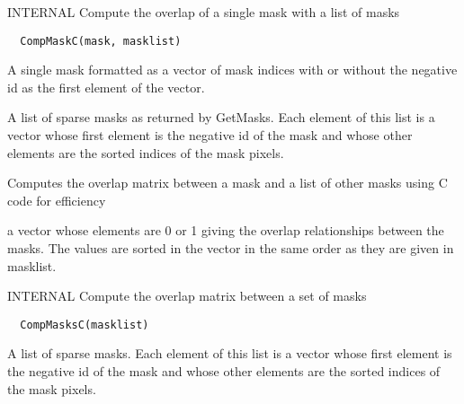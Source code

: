 \documentclass[a4paper]{book}
\begin{document}
%
\begin{Description}\relax
INTERNAL Compute the overlap of a single mask with a list
of masks
\end{Description}
%
\begin{Usage}
\begin{verbatim}
  CompMaskC(mask, masklist)
\end{verbatim}
\end{Usage}
%
\begin{Arguments}
\begin{ldescription}
\item[\code{mask}] A single mask formatted as a vector of mask
indices with or without the negative id as the first
element of the vector.

\item[\code{masklist}] A list of sparse masks as returned by
GetMasks.  Each element of this list is a vector whose
first element is the negative id of the mask and whose
other elements are the sorted indices of the mask
pixels.
\end{ldescription}
\end{Arguments}
%
\begin{Details}\relax
Computes the overlap matrix between a mask and a list of
other masks using C code for efficiency
\end{Details}
%
\begin{Value}
a vector whose elements are 0 or 1 giving the overlap
relationships between the masks.  The values are sorted
in the vector in the same order as they are given in
masklist.
\end{Value}
%
\begin{Description}\relax
INTERNAL Compute the overlap matrix between a set of
masks
\end{Description}
%
\begin{Usage}
\begin{verbatim}
  CompMasksC(masklist)
\end{verbatim}
\end{Usage}
%
\begin{Arguments}
\begin{ldescription}
\item[\code{masklist}] A list of sparse masks.  Each element of
this list is a vector whose first element is the negative
id of the mask and whose other elements are the sorted
indices of the mask pixels.
\end{ldescription}
\end{Arguments}
\end{document}
